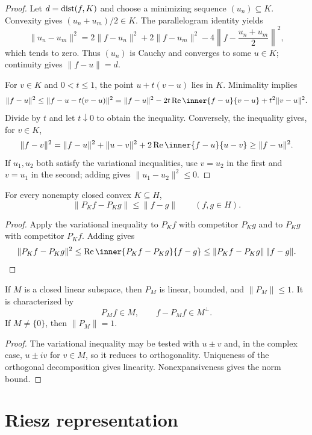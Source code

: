\begin{proof}
Let $d=\operatorname{dist}(f,K)$ and choose a minimizing sequence $(u_n)\subseteq K$.
Convexity gives $(u_n+u_m)/2\in K$.  The parallelogram identity yields
\[
 \|u_n-u_m\|^2
 =2\|f-u_n\|^2+2\|f-u_m\|^2
  -4\left\|f-\frac{u_n+u_m}{2}\right\|^2,
\]
which tends to zero.  Thus $(u_n)$ is Cauchy and converges to some $u\in K$;
continuity gives $\|f-u\|=d$.

For $v\in K$ and $0<t\le1$, the point $u+t(v-u)$ lies in $K$.  Minimality
implies
\[
  \|f-u\|^2
  \le\|f-u-t(v-u)\|^2
  =\|f-u\|^2-2t\operatorname{Re}\inner{f-u}{v-u}
    +t^2\|v-u\|^2.
\]
Divide by $t$ and let $t\downarrow0$ to obtain the inequality.  Conversely,
the inequality gives, for $v\in K$,
\[
  \|f-v\|^2
  =\|f-u\|^2+\|u-v\|^2
    +2\operatorname{Re}\inner{f-u}{u-v}
  \ge\|f-u\|^2.
\]
If $u_1,u_2$ both satisfy the variational inequalities, use $v=u_2$ in the
first and $v=u_1$ in the second; adding gives
$\|u_1-u_2\|^2\le0$.
\end{proof}

\begin{noteproposition}
For every nonempty closed convex $K\subseteq H$,
\[
  \|P_Kf-P_Kg\|\le\|f-g\|
  \qquad(f,g\in H).
\]
\end{noteproposition}

\begin{proof}
Apply the variational inequality to $P_Kf$ with competitor $P_Kg$ and to
$P_Kg$ with competitor $P_Kf$.  Adding gives
\[
  \|P_Kf-P_Kg\|^2
  \le\operatorname{Re}\inner{P_Kf-P_Kg}{f-g}
  \le\|P_Kf-P_Kg\|\,\|f-g\|.
\]
\end{proof}

\begin{notecorollary}
If $M$ is a closed linear subspace, then $P_M$ is linear, bounded, and
$\|P_M\|\le1$.  It is characterized by
\[
  P_Mf\in M,
  \qquad
  f-P_Mf\in M^\perp.
\]
If $M\ne\{0\}$, then $\|P_M\|=1$.
\end{notecorollary}

\begin{proof}
The variational inequality may be tested with $u\pm v$ and, in the complex
case, $u\pm iv$ for $v\in M$, so it reduces to orthogonality.  Uniqueness of
the orthogonal decomposition gives linearity.  Nonexpansiveness gives the norm
bound.
\end{proof}

\section{Riesz representation}

